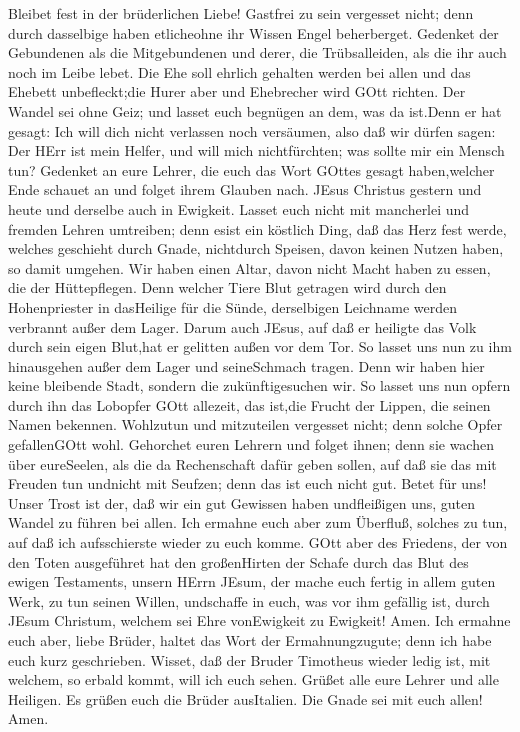  Bleibet fest in der brüderlichen Liebe! 
Gastfrei zu sein vergesset nicht; denn durch dasselbige haben
etlicheohne ihr Wissen Engel beherberget.  Gedenket der
Gebundenen als die Mitgebundenen und derer, die Trübsalleiden, als die
ihr auch noch im Leibe lebet.  Die Ehe soll ehrlich gehalten
werden bei allen und das Ehebett unbefleckt;die Hurer aber und
Ehebrecher wird GOtt richten.  Der Wandel sei ohne Geiz; und
lasset euch begnügen an dem, was da ist.Denn er hat gesagt: Ich will
dich nicht verlassen noch versäumen,  also daß wir dürfen
sagen: Der HErr ist mein Helfer, und will mich nichtfürchten; was sollte
mir ein Mensch tun?  Gedenket an eure Lehrer, die euch das
Wort GOttes gesagt haben,welcher Ende schauet an und folget ihrem
Glauben nach.  JEsus Christus gestern und heute und derselbe
auch in Ewigkeit.  Lasset euch nicht mit mancherlei und
fremden Lehren umtreiben; denn esist ein köstlich Ding, daß das Herz
fest werde, welches geschieht durch Gnade, nichtdurch Speisen, davon
keinen Nutzen haben, so damit umgehen.  Wir haben einen
Altar, davon nicht Macht haben zu essen, die der Hüttepflegen.
 Denn welcher Tiere Blut getragen wird durch den
Hohenpriester in dasHeilige für die Sünde, derselbigen Leichname werden
verbrannt außer dem Lager.  Darum auch JEsus, auf daß er
heiligte das Volk durch sein eigen Blut,hat er gelitten außen vor dem
Tor.  So lasset uns nun zu ihm hinausgehen außer dem Lager
und seineSchmach tragen.  Denn wir haben hier keine
bleibende Stadt, sondern die zukünftigesuchen wir.  So
lasset uns nun opfern durch ihn das Lobopfer GOtt allezeit, das ist,die
Frucht der Lippen, die seinen Namen bekennen.  Wohlzutun
und mitzuteilen vergesset nicht; denn solche Opfer gefallenGOtt wohl.
 Gehorchet euren Lehrern und folget ihnen; denn sie wachen
über eureSeelen, als die da Rechenschaft dafür geben sollen, auf daß sie
das mit Freuden tun undnicht mit Seufzen; denn das ist euch nicht gut.
 Betet für uns! Unser Trost ist der, daß wir ein gut
Gewissen haben undfleißigen uns, guten Wandel zu führen bei allen.
 Ich ermahne euch aber zum Überfluß, solches zu tun, auf
daß ich aufsschierste wieder zu euch komme.  GOtt aber des
Friedens, der von den Toten ausgeführet hat den großenHirten der Schafe
durch das Blut des ewigen Testaments, unsern HErrn JEsum, 
der mache euch fertig in allem guten Werk, zu tun seinen Willen,
undschaffe in euch, was vor ihm gefällig ist, durch JEsum Christum,
welchem sei Ehre vonEwigkeit zu Ewigkeit! Amen.  Ich
ermahne euch aber, liebe Brüder, haltet das Wort der Ermahnungzugute;
denn ich habe euch kurz geschrieben.  Wisset, daß der
Bruder Timotheus wieder ledig ist, mit welchem, so erbald kommt, will
ich euch sehen.  Grüßet alle eure Lehrer und alle Heiligen.
Es grüßen euch die Brüder ausItalien.  Die Gnade sei mit
euch allen! Amen.
